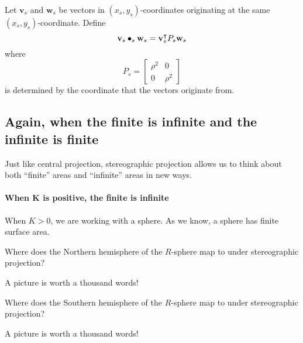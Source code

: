 \documentclass[newpage,hints,handout,12pt,noauthor,nooutcomes]{ximera}
\begin{document}
\begin{definition}
  Let $\mathbf{v}_s$ and $\mathbf{w}_s$ be vectors in $(x_s,y_s)$-coordinates
  originating at the same $(x_s,y_s)$-coordinate. Define
  \[
  \mathbf{v}_s \bullet_s \mathbf{w}_s = \mathbf{v}_s^\intercal P_s \mathbf{w}_s
  \]
  where
  \[
  P_s =
  \begin{bmatrix}
    \rho^2 & 0\\
    0 & \rho^2
  \end{bmatrix}
  \]
  is determined by the coordinate that the vectors originate from.
\end{definition}








\subsection{Again, when the finite is infinite and the infinite is finite}

Just like central projection, stereographic projection allows us to
think about both ``finite'' areas and ``infinite'' areas in new ways.

\paragraph{When $\boldsymbol K$ is positive, the finite is infinite}

When $K>0$, we are working with a sphere. As we know, a sphere has
finite surface area.



\begin{problem}
  Where does the Northern hemisphere of the $R$-sphere map to under stereographic projection?
  \begin{hint}
    A picture is worth a thousand words!
  \end{hint}
  \begin{freeResponse}
  \end{freeResponse}
\end{problem}


\begin{problem}
  Where does the Southern hemisphere of the $R$-sphere map to under stereographic projection?
  \begin{hint}
    A picture is worth a thousand words!
  \end{hint}
  \begin{freeResponse}
  \end{freeResponse}
\end{problem}
\end{document}
